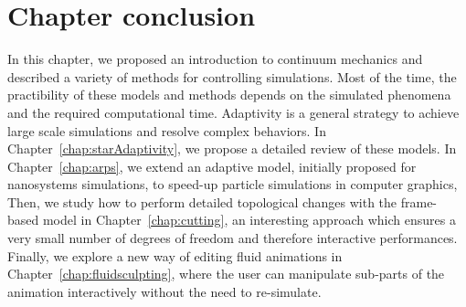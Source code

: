 \section{Chapter conclusion}
In this chapter, we proposed an introduction to continuum mechanics and described a variety of methods for controlling simulations.
Most of the time, the practibility of these models and methods depends on the simulated phenomena and the required computational time.
Adaptivity is a general strategy to achieve large scale simulations and resolve complex behaviors.
In Chapter~\ref{chap:starAdaptivity}, we propose a detailed review of these models.
In Chapter~\ref{chap:arps}, we extend an adaptive model, initially proposed for nanosystems simulations, to speed-up particle simulations in computer graphics, 
Then, we study how to perform detailed topological changes with the frame-based model in Chapter~\ref{chap:cutting}, an interesting approach which ensures a very small number of degrees of freedom and therefore interactive performances.
Finally, we explore a new way of editing fluid animations in Chapter~\ref{chap:fluidsculpting}, where the user can manipulate sub-parts of the animation interactively without the need to re-simulate.
